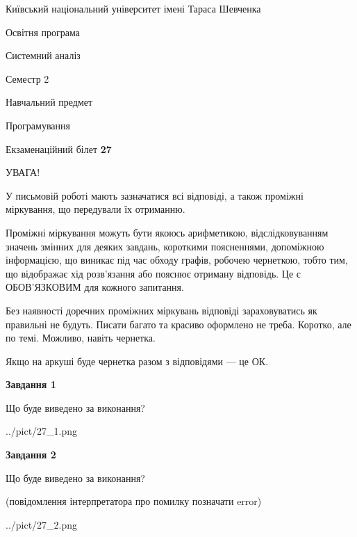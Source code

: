 \documentclass[12pt, ukrainian]{article}
\begin{document}
{{\begin {small}\par
{ \center  Київський національний університет імені Тараса Шевченка \par}
{\parbox {5 cm}{Освітня програма \hfill}{\parbox {7 cm}{Системний аналіз \hfill}}\parbox {6 cm}{\hfill Семестр 2}}\par
{\parbox {5 cm} {Навчальний предмет \hfill}\parbox {7 cm}{Програмування \hfill}\parbox {6cm}{\hfill}\par}\vspace{-7pt} \end{small}}{\center Екзаменаційний білет \No \textbf
{ 27 }\par}}
{
\begin {large}
УВАГА!

У письмовій роботі мають зазначатися всі відповіді, а також проміжні міркування, що передували їх отриманню.

Проміжні міркування можуть бути якоюсь арифметикою, відслідковуванням зна\-чень змінних для деяких завдань,
короткими поясненнями, допоміжною інформацією, що виникає під час обходу графів, робочею чернеткою,
тобто тим, що відображає хід розв’язання або пояснює отриману відповідь.
Це є ОБОВ’ЯЗКОВИМ для кожного запитання.

Без наявності доречних проміжних міркувань відповіді зараховуватись як правиль\-ні не будуть.
Писати багато та красиво оформлено не треба. Коротко, але по темі. Можли\-во, навіть чернетка.

Якщо на аркуші буде чернетка разом з відповідями --- це ОК.

\newpage

{\begin {center}\textbf{Завдання 1}\end {center}}\par
Що буде виведено за виконання?\par
\begin{center}
	{../pict/27_1.png}
\end{center}
\newpage

{\begin {center}\textbf{Завдання 2}\end {center}}\par
Що буде виведено за виконання?\par
 (повідомлення інтерпретатора про помилку позначати error)\par
\begin{center}
	{../pict/27_2.png}
\end{center}
\newpage


\end{large}}
\end{document}
